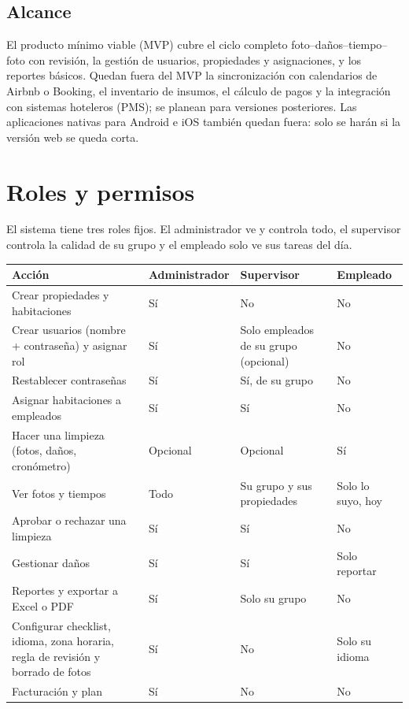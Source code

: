 \documentclass[11pt,a4paper]{article}
\begin{document}
\subsection{Alcance}

El producto mínimo viable (MVP) cubre el ciclo completo foto--daños--tiempo--foto con revisión, la gestión de usuarios, propiedades y asignaciones, y los reportes básicos. Quedan fuera del MVP la sincronización con calendarios de Airbnb o Booking, el inventario de insumos, el cálculo de pagos y la integración con sistemas hoteleros (PMS); se planean para versiones posteriores. Las aplicaciones nativas para Android e iOS también quedan fuera: solo se harán si la versión web se queda corta.

\section{Roles y permisos}

El sistema tiene tres roles fijos. El administrador ve y controla todo, el supervisor controla la calidad de su grupo y el empleado solo ve sus tareas del día.

\begin{center}
\small
\begin{tabularx}{\linewidth}{Y L{2.6cm} L{3.1cm} L{2.4cm}}
\toprule
\textbf{Acción} & \textbf{Administrador} & \textbf{Supervisor} & \textbf{Empleado}\\
\midrule
Crear propiedades y habitaciones & Sí & No & No\\
Crear usuarios (nombre + contraseña) y asignar rol & Sí & Solo empleados de su grupo (opcional) & No\\
Restablecer contraseñas & Sí & Sí, de su grupo & No\\
Asignar habitaciones a empleados & Sí & Sí & No\\
Hacer una limpieza (fotos, daños, cronómetro) & Opcional & Opcional & Sí\\
Ver fotos y tiempos & Todo & Su grupo y sus propiedades & Solo lo suyo, hoy\\
Aprobar o rechazar una limpieza & Sí & Sí & No\\
Gestionar daños & Sí & Sí & Solo reportar\\
Reportes y exportar a Excel o PDF & Sí & Solo su grupo & No\\
Configurar checklist, idioma, zona horaria, regla de revisión y borrado de fotos & Sí & No & Solo su idioma\\
Facturación y plan & Sí & No & No\\
\bottomrule
\end{tabularx}
\end{center}
\end{document}

